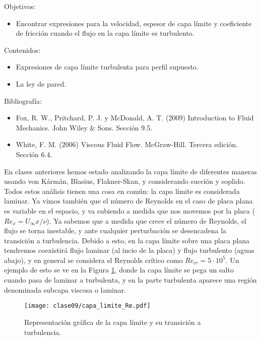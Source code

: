 \begin{framed}

Objetivos:
\begin{itemize}
    \item Encontrar expresiones para la velocidad, espesor de capa límite y coeficiente de fricción cuando el flujo en la capa límite es turbulento. 
\end{itemize}

Contenidos:
\begin{itemize}
    \item Expresiones de capa límite turbulenta para perfil supuesto.
    \item La ley de pared. 
\end{itemize}

Bibliografía:
\begin{itemize}
    \item Fox, R. W., Pritchard, P. J. y McDonald, A. T. (2009) Introduction to Fluid Mechanics. John Wiley \& Sons. Sección 9.5.
    \item White, F. M. (2006) Viscous Fluid Flow. McGraw-Hill. Tercera edición. Sección 6.4.
\end{itemize}
\end{framed}

En clases anteriores hemos estado analizando la capa límite de diferentes maneras usando von Kármán, Blasius, Flakner-Skan, y considerando succión y soplido.
Todos estos análisis tienen una cosa en común: la capa límite es considerada laminar.
Ya vimos también que el número de Reynolds en el caso de placa plana es variable en el espacio, y va subiendo a medida que nos movemos por la placa ($Re_x=U_\infty x/\nu$).
Ya sabemos que a medida que crece el número de Reynolds, el flujo se torna inestable, y ante cualquier perturbación se desencadena la transición a turbulencia.
Debido a esto, en la capa límite sobre una placa plana tendremos coexistirá flujo laminar (al incio de la placa) y flujo turbulento (aguas abajo), y en general se considera el Reynolds crítico como $Re_{cr} = 5\cdot10^{5}$.
Un ejemplo de esto se ve en la Figura \ref{fig:capa_limite_Re}, donde la capa límite se pega un salto cuando pasa de laminar a turbulenta, y en la parte turbulenta aparece una región denominada subcapa viscosa o laminar.
%
\begin{figure}
\centering
\texttt{[image: clase09/capa\_limite\_Re.pdf]}
\caption{Representación gráfica de la capa límite y su transición a turbulencia.}
\label{fig:capa_limite_Re}
\end{figure}


